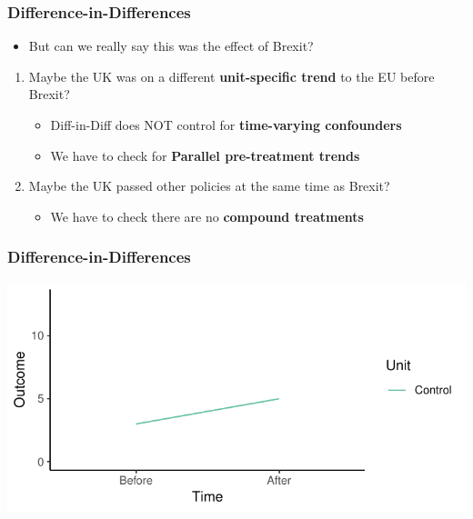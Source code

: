 \documentclass[xcolor=x11names,compress]{beamer}\usepackage[]{graphicx}\usepackage[]{color}
\makeatletter
\def\maxwidth{ %
  \ifdim\Gin@nat@width>\linewidth
    \linewidth
  \else
    \Gin@nat@width
  \fi
}
\newenvironment{knitrout}{}{} %
\renewcommand{\(}{\begin{columns}}
\renewcommand{\)}{\end{columns}}
\newcommand{\<}[1]{\begin{column}{#1}}
\renewcommand{\>}{\end{column}}
\makeatother
\begin{document}
\begin{frame}
\frametitle{Difference-in-Differences}
\begin{itemize}
\item But can we really say this was the effect of Brexit?
\end{itemize}
\pause
\begin{enumerate}
\item Maybe the UK was on a different \textbf{unit-specific trend} to the EU before Brexit?
\pause
\begin{itemize}
\item Diff-in-Diff does NOT control for \textbf{time-varying confounders}
\pause
\item We have to check for \textbf{Parallel pre-treatment trends}
\pause
\end{itemize}
\item Maybe the UK passed other policies at the same time as Brexit?
\pause
\begin{itemize}
\item We have to check there are no \textbf{compound treatments}
\end{itemize}
\end{enumerate}
\end{frame}

\begin{frame}
\frametitle{Difference-in-Differences}
\begin{knitrout}
\color{fgcolor}
\includegraphics[width=\maxwidth]{figure/DinD_chart1-1} 

\end{knitrout}
\end{frame}
\end{document}
